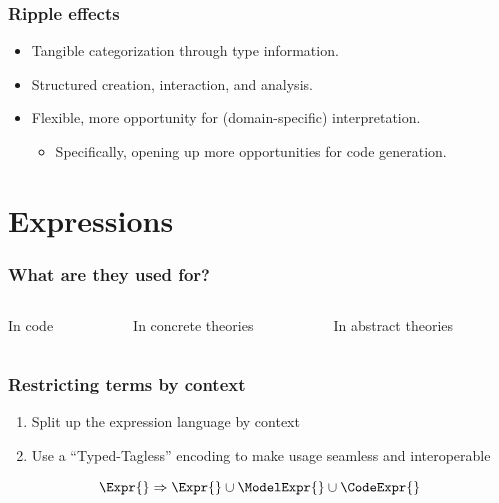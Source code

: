 \documentclass[xcolor={dvipsnames}]{beamer}
\begin{document}
\begin{frame}
  \frametitle{Ripple effects}

  \begin{itemize}
    \item Tangible categorization through type information.
    \item Structured creation, interaction, and analysis.
    \item Flexible, more opportunity for (domain-specific) interpretation.
      \begin{itemize}
        \item Specifically, opening up more opportunities for code generation.
      \end{itemize}
  \end{itemize}

\end{frame}

\section{Expressions}

\begin{frame}
  \frametitle{What are they used for?}

  \begin{columns}
    \begin{column}{0.3\textwidth}
      \missingfigure{}
      In code
    \end{column}
    \hfill
    \begin{column}{0.3\textwidth}
      \missingfigure{}
      In concrete theories
    \end{column}
    \hfill
    \begin{column}{0.3\textwidth}
      \missingfigure{}
      In abstract theories
    \end{column}
  \end{columns}
\end{frame}

\begin{frame}
  \frametitle{Restricting terms by context}

  \begin{enumerate}
    \item Split up the expression language by context
    \item Use a ``Typed-Tagless'' encoding to make usage seamless and
          interoperable
  \end{enumerate}

  \[\Expr{} \Rightarrow{} \Expr{} \cup{} \ModelExpr{} \cup{} \CodeExpr{}\]

\end{frame}
\end{document}
